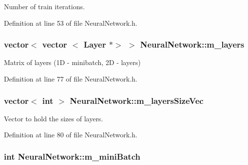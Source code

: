 Number of train iterations. 



Definition at line 53 of file Neural\+Network.\+h.

\subsubsection[{\texorpdfstring{m\+\_\+layers}{m_layers}}]{\setlength{\rightskip}{0pt plus 5cm}vector$<$ vector $<$ {\bf Layer} $\ast$$>$ $>$ Neural\+Network\+::m\+\_\+layers\hspace{0.3cm}{\ttfamily [protected]}}\hypertarget{classNeuralNetwork_ab2bc4d407ef6b85a0089aaaa600e0fb8}{}\label{classNeuralNetwork_ab2bc4d407ef6b85a0089aaaa600e0fb8}


Matrix of layers (1D -\/ minibatch, 2D -\/ layers) 



Definition at line 77 of file Neural\+Network.\+h.

\subsubsection[{\texorpdfstring{m\+\_\+layers\+Size\+Vec}{m_layersSizeVec}}]{\setlength{\rightskip}{0pt plus 5cm}vector$<$ int $>$ Neural\+Network\+::m\+\_\+layers\+Size\+Vec\hspace{0.3cm}{\ttfamily [protected]}}\hypertarget{classNeuralNetwork_a91b00cd0bb975be91e76eb13ffcfe78f}{}\label{classNeuralNetwork_a91b00cd0bb975be91e76eb13ffcfe78f}


Vector to hold the sizes of layers. 



Definition at line 80 of file Neural\+Network.\+h.

\subsubsection[{\texorpdfstring{m\+\_\+mini\+Batch}{m_miniBatch}}]{\setlength{\rightskip}{0pt plus 5cm}int Neural\+Network\+::m\+\_\+mini\+Batch\hspace{0.3cm}{\ttfamily [protected]}}\hypertarget{classNeuralNetwork_ad29fd15c4f0fc4c8fd214b4e815093b9}{}\label{classNeuralNetwork_ad29fd15c4f0fc4c8fd214b4e815093b9}


